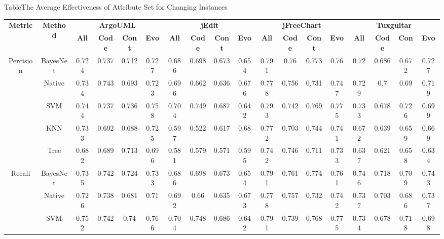 {{\begin{table*}[htbp]
\scriptsize
{Table$\!$}{The Average Effectiveness of Attribute Set for Changing Instances}
\vspace{0.5em}
\centering
\begin{tabular}{cccccccccccccccccc}
\toprule[1.5pt]
\multirow{2}{*}{\textbf{Metric}}&\multirow{2}{*}{\textbf{Method}}&\multicolumn{4}{c}{\textbf{ArgoUML}}&\multicolumn{4}{c}{\textbf{jEdit}}&\multicolumn{4}{c}{\textbf{jFreeChart}}&\multicolumn{4}{c}{\textbf{Tuxguitar}}\\
\cline{3-18}
&&\textbf{All}&\textbf{Code}&\textbf{Cont}&\textbf{Evo}&\textbf{All}&\textbf{Code}&\textbf{Cont}&\textbf{Evo}&\textbf{All}&\textbf{Code}&\textbf{Cont}&\textbf{Evo}&\textbf{All}&\textbf{Code}&\textbf{Con}&\textbf{Evo}~\\
\midrule[1pt]
\multirow{5}{*}{Percision}
&BayesNet&	0.724&	0.737&	0.712&	0.727&		0.686&	0.698&	0.673&	0.654&	0.791&	0.76&	0.773&	0.76&		0.72&	0.686&	0.672&	0.727\\
&Native&	0.734&	0.743&	0.693&	0.723&		0.696&	0.662&	0.636&	0.676&	0.778&	0.756&	0.731&	0.747&		0.729&	0.7	&0.69&	0.719\\
&SVM&	0.744&	0.737&	0.736&	0.758&		0.704&	0.749&	0.687&	0.642&		0.793&	0.742&	0.769&	0.775&		0.733&	0.678&	0.726&	0.699\\
&KNN&	0.733&	0.692&	0.688&	0.725&		0.597&	0.522&	0.617&	0.68&		0.772&	0.703&	0.744&	0.741&		0.672&	0.639&	0.659&	0.669\\
&Tree&	0.682&	0.689&	0.713&	0.696&		0.581&	0.579&	0.571&	0.595&		0.742&	0.746&	0.711&	0.733&		0.637&	0.621&	0.658&	0.634\\
\hline
\multirow{5}{*}{Recall}
&BayesNet&	0.735&	0.742&	0.724&	0.733&		0.686&	0.698&	0.673&	0.654&	0.791&	0.761&	0.774&	0.761&		0.746&	0.718&	0.709&	0.743\\
&Native&	0.726&	0.738&	0.681&	0.71&		0.692&	0.66&	0.635&	0.673&		0.778&	0.757&	0.732&	0.742&		0.737&	0.703&	0.686&	0.737\\
&SVM&	0.752&	0.742&	0.74&	0.766&		0.704&	0.748&	0.686&	0.642&		0.791&	0.739&	0.768&	0.775&		0.734&	0.678&	0.718&	0.698\\

\end{tabular}
\end{table*}}}
